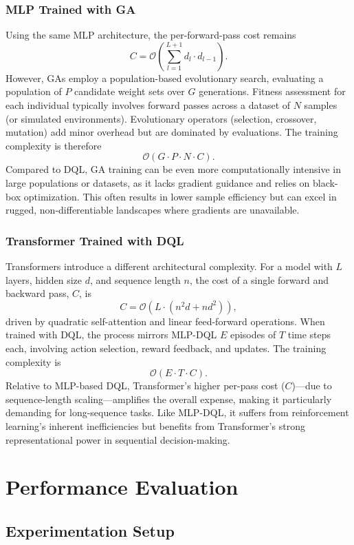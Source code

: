 \documentclass[preprint,3p,authoryear]{elsarticle}
\begin{document}
\subsubsection{MLP Trained with GA}
Using the same MLP architecture, the per-forward-pass cost remains
\[
C = \mathcal{O}\!\left( \sum_{l=1}^{L+1} d_l \cdot d_{l-1} \right).
\]
However, GAs employ a population-based evolutionary search, evaluating a population of $P$ candidate weight sets over $G$ generations. Fitness assessment for each individual typically involves forward passes across a dataset of $N$ samples (or simulated environments). Evolutionary operators (selection, crossover, mutation) add minor overhead but are dominated by evaluations. The training complexity is therefore
\[
\mathcal{O}(G \cdot P \cdot N \cdot C).
\]
Compared to DQL, GA training can be even more computationally intensive in large populations or datasets, as it lacks gradient guidance and relies on black-box optimization. This often results in lower sample efficiency but can excel in rugged, non-differentiable landscapes where gradients are unavailable.

\subsubsection{Transformer Trained with DQL}
Transformers introduce a different architectural complexity. For a model with $L$ layers, hidden size $d$, and sequence length $n$, the cost of a single forward and backward pass, $C$, is
\[
C = \mathcal{O}\!\left( L \cdot (n^2 d + n d^2) \right),
\]
driven by quadratic self-attention and linear feed-forward operations. When trained with DQL, the process mirrors MLP-DQL\: $E$ episodes of $T$ time steps each, involving action selection, reward feedback, and updates. The training complexity is
\[
\mathcal{O}(E \cdot T \cdot C).
\]
Relative to MLP-based DQL, Transformer’s higher per-pass cost ($C$)—due to sequence-length scaling—amplifies the overall expense, making it particularly demanding for long-sequence tasks. Like MLP-DQL, it suffers from reinforcement learning's inherent inefficiencies but benefits from Transformer’s strong representational power in sequential decision-making.



\section{Performance Evaluation}\label{sec:performance_evaluation}


\subsection{Experimentation Setup}
\end{document}
